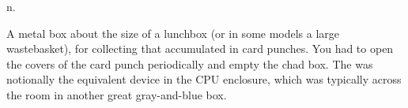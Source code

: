  n.

A metal box about the size of a lunchbox (or in some models a large
wastebasket), for collecting  that accumulated in
 card punches. You had to open the covers of the card punch
periodically and empty the chad box. The  was notionally
the equivalent device in the CPU enclosure, which was typically across the room
in another great gray-and-blue box.

